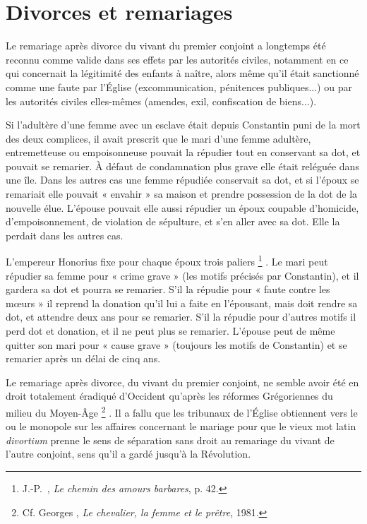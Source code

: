 \section{Divorces et remariages}

 Le remariage après divorce du vivant du premier conjoint a longtemps été reconnu comme valide dans ses effets par les autorités civiles, notamment en ce qui concernait la légitimité des enfants à naître, alors même qu'il était sanctionné comme une faute par l'Église (excommunication, pénitences publiques...) ou par les autorités civiles elles-mêmes (amendes, exil, confiscation de biens...). 

 Si l'adultère d'une femme avec un esclave était depuis Constantin puni de la mort des deux complices, il avait prescrit que le mari d'une femme adultère, entremetteuse ou empoisonneuse pouvait la répudier tout en conservant sa dot, et pouvait se remarier. À défaut de condamnation plus grave elle était reléguée dans une île. Dans les autres cas une femme répudiée conservait sa dot, et si l'époux se remariait elle pouvait « envahir » sa maison et prendre possession de la dot de la nouvelle élue. L'épouse pouvait elle aussi répudier un époux coupable d'homicide, d'empoisonnement, de violation de sépulture, et s'en aller avec sa dot. Elle la perdait dans les autres cas. 

 L'empereur Honorius fixe pour chaque époux trois paliers%
\footnote{J.-P.~, \emph{Le chemin des amours barbares}, p. 42.}%
. Le mari peut répudier sa femme pour « crime grave » (les motifs précisés par Constantin), et il gardera sa dot et pourra se remarier. S'il la répudie pour « faute contre les mœurs » il reprend la donation qu'il lui a faite en l'épousant, mais doit rendre sa dot, et attendre deux ans pour se remarier. S'il la répudie pour d'autres motifs il perd dot et donation, et il ne peut plus se remarier. L'épouse peut de même quitter son mari pour « cause grave » (toujours les motifs de Constantin) et se remarier après un délai de cinq ans.

 Le remariage après divorce, du vivant du premier conjoint, ne semble avoir été en droit totalement éradiqué d'Occident qu'après les réformes Grégoriennes du milieu du Moyen-Âge%
\footnote{Cf. Georges , \emph{Le chevalier, la femme et le prêtre}, 1981.}%
. Il a fallu que les tribunaux de l'Église obtiennent vers le \ieme{} ou  le monopole sur les affaires concernant le mariage pour que le vieux mot latin \emph{divortium} prenne le sens de séparation sans droit au remariage du vivant de l'autre conjoint, sens qu'il a gardé jusqu'à la Révolution. 


